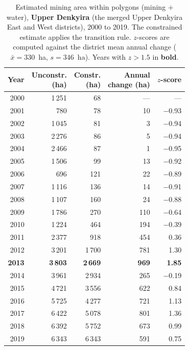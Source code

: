 \documentclass[]{interact}
\begin{document}
\begin{table}[H]
\centering
\caption{Estimated mining area within polygons (mining $+$ water), \textbf{Upper Denkyira} (the merged Upper Denkyira East and West districts), 2000 to 2019. The constrained estimate applies the transition rule. $z$-scores are computed against the district mean annual change ($\bar{x} = 330$~ha, $s = 346$~ha). Years with $z > 1.5$ in \textbf{bold}.}
\label{tab:district_denkyira}
\small
\begin{tabular}{@{}rrrrr@{}}
\toprule
Year & \makecell[r]{Unconstr.\\(ha)} & \makecell[r]{Constr.\\(ha)} & \makecell[r]{Annual\\change (ha)} & $z$-score \\
\midrule
      2000 & 1\,251 & 68 & --- & --- \\
      2001 & 780 & 78 & 10 & $-$0.93 \\
      2002 & 1\,045 & 81 & 3 & $-$0.94 \\
      2003 & 2\,276 & 86 & 5 & $-$0.94 \\
      2004 & 2\,466 & 87 & 1 & $-$0.95 \\
      2005 & 1\,506 & 99 & 13 & $-$0.92 \\
      2006 & 696 & 121 & 22 & $-$0.89 \\
      2007 & 1\,116 & 136 & 14 & $-$0.91 \\
      2008 & 1\,107 & 160 & 24 & $-$0.88 \\
      2009 & 1\,786 & 270 & 110 & $-$0.64 \\
      2010 & 1\,224 & 464 & 194 & $-$0.39 \\
      2011 & 2\,377 & 918 & 454 & \phantom{$-$}0.36 \\
      2012 & 3\,201 & 1\,700 & 781 & \phantom{$-$}1.30 \\
      \textbf{2013} & \textbf{3\,803} & \textbf{2\,669} & \textbf{969} & \textbf{\phantom{$-$}1.85} \\
      2014 & 3\,961 & 2\,934 & 265 & $-$0.19 \\
      2015 & 4\,721 & 3\,556 & 622 & \phantom{$-$}0.84 \\
      2016 & 5\,725 & 4\,277 & 721 & \phantom{$-$}1.13 \\
      2017 & 6\,422 & 5\,078 & 801 & \phantom{$-$}1.36 \\
      2018 & 6\,392 & 5\,752 & 673 & \phantom{$-$}0.99 \\
      2019 & 6\,343 & 6\,343 & 591 & \phantom{$-$}0.75 \\
\bottomrule
\end{tabular}
\end{table}
 
\end{document}
